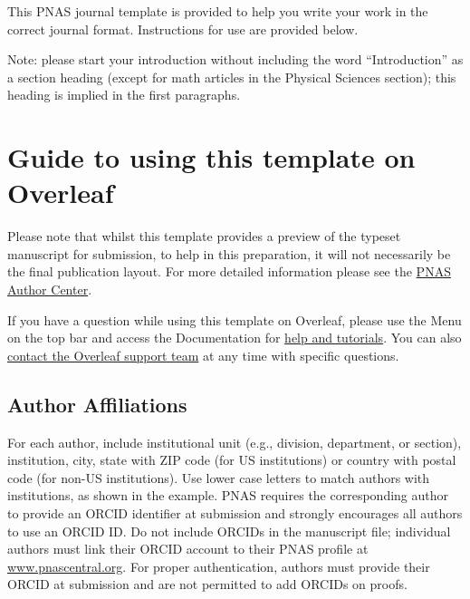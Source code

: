 \documentclass[9pt,twocolumn,twoside]{pnas-new}
\begin{document}
\maketitle
\thispagestyle{firststyle}

\Firstpage


This PNAS journal template is provided to help you write your work in the correct journal format. Instructions for use are provided below.

Note: please start your introduction without including the word ``Introduction'' as a section heading (except for math articles in the Physical Sciences section); this heading is implied in the first paragraphs.

\section*{Guide to using this template on Overleaf}

Please note that whilst this template provides a preview of the typeset manuscript for submission, to help in this preparation, it will not necessarily be the final publication layout. For more detailed information please see the  \href{https://www.pnas.org/author-center/submitting-your-manuscript}{PNAS Author Center}.


If you have a question while using this template on Overleaf, please use the Menu on the top bar and access the Documentation for \href{https://www.overleaf.com/help}{help and tutorials}. You can also \href{https://www.overleaf.com/contact}{contact the Overleaf support team} at any time with specific questions.

\subsection*{Author Affiliations}

For each author, include institutional unit (e.g., division, department, or section), institution, city, state with ZIP code (for US institutions) or country with postal code (for non-US institutions). Use lower case letters to match authors with institutions, as shown in the example. PNAS requires the corresponding author to provide an ORCID identifier at submission and strongly encourages all authors to use an ORCID ID. Do not include ORCIDs in the manuscript file; individual authors must link their ORCID account to their PNAS profile at \href{http://www.pnascentral.org/}{www.pnascentral.org}. For proper authentication, authors must provide their ORCID at submission and are not permitted to add ORCIDs on proofs.
\end{document}
